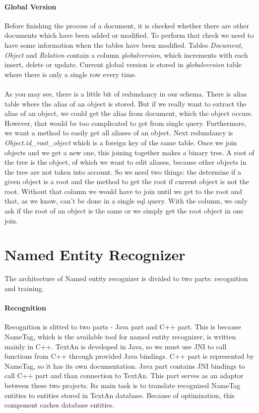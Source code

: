 \paragraph{Global Version} Before finishing the process of a document, it is checked whether there
are other documents which have been added or modified. To perform that check we need to have some information
when the tables have been modified. Tables \emph{Document}, \emph{Object} and \emph{Relation} 
contain a column \emph{globalversion}, which increments with each insert, delete or update. 
Current global version is stored in \emph{globalversion} table where there is only a single row every time.

\paragraph{} As you may see, there is a little bit of redundancy in our schema. There is alias table where the alias of an object is stored. But if we really want to extract the alias of an object, we could get the alias from document, which the object occurs. However, that would be too complicated to get from single query. Furthermore, we want a method to easily get all aliases of an object.
Next redundancy is \emph{Object.id\_{}root\_{}object} which is a foreign key of the same table. Once we join objects and we get a new one, this joining together makes a binary tree. A root of the tree is the object, of which we want to edit aliases, because other objects in the tree are not taken into account. So we need two things: the determine if a given object is a root and the method to get the root if current object is not the root. Without that column we would have to join until we get to the root and that, as we know, can't be done in a single sql query. With the column, we only ask if the root of an object is the same or we simply get the root object in one join.


\section{Named Entity Recognizer}
\label{sec:NamedEntityRecognizer}

The architecture of Named entity recognizer is divided to two parts: recognition and training.

\paragraph{Recognition} 
Recognition is slitted to two parts - Java part and C++ part. This is because
NameTag, which is the available tool for named entity recognizer, is written mainly in C++. 
TextAn is developed in Java, so we must use JNI to call functions from C++ through provided
Java bindings. C++ part is represented by NameTag, so it has its own documentation.
Java part contains JNI bindings to call C++ part and than connection to TextAn.
This part serves as an adaptor between these two projects. Its main task is
to translate recognized NameTag entities to entities stored in TextAn database.
Because of optimization, this component caches database entities.

